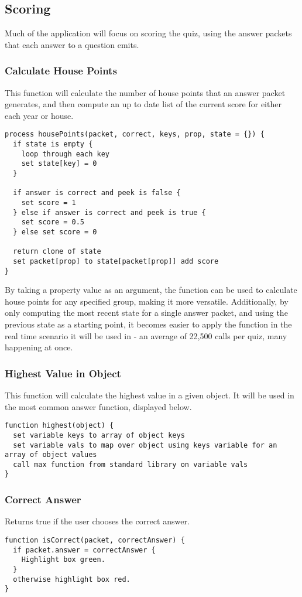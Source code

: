 \subsection{Scoring}
Much of the application will focus on scoring the quiz, using the answer packets that each answer to a question emits.

\subsubsection{Calculate House Points}
This function will calculate the number of house points that an answer packet generates, and then compute an up to date list of the current score for either each year or house.
\begin{verbatim}
process housePoints(packet, correct, keys, prop, state = {}) {
  if state is empty {
    loop through each key
    set state[key] = 0
  }

  if answer is correct and peek is false {
    set score = 1
  } else if answer is correct and peek is true {
    set score = 0.5
  } else set score = 0

  return clone of state
  set packet[prop] to state[packet[prop]] add score
}
\end{verbatim}
By taking a property value as an argument, the function can be used to calculate house points for any specified group, making it more versatile. Additionally, by only computing the most recent state for a single answer packet, and using the previous state as a starting point, it becomes easier to apply the function in the real time scenario it will be used in - an average of 22,500 calls per quiz, many happening at once.

\subsubsection{Highest Value in Object}
This function will calculate the highest value in a given object. It will be used in the most common answer function, displayed below.
\begin{verbatim}
function highest(object) {
  set variable keys to array of object keys
  set variable vals to map over object using keys variable for an array of object values
  call max function from standard library on variable vals
}
\end{verbatim}

\subsubsection{Correct Answer}
Returns true if the user chooses the correct answer.
\begin{verbatim}
function isCorrect(packet, correctAnswer) {
  if packet.answer = correctAnswer {
    Highlight box green.
  }
  otherwise highlight box red.
}
\end{verbatim}


